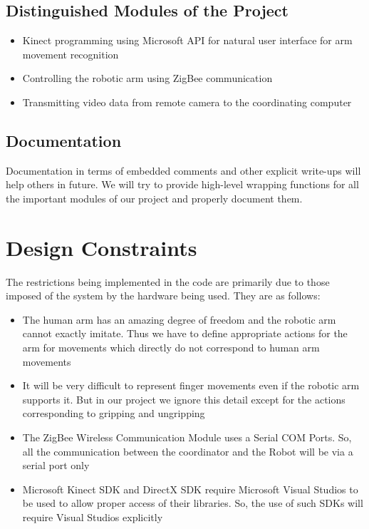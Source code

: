 \documentclass[a4wide]{scrreprt}
\begin{document}
\subsection{Distinguished Modules of the Project}
\begin{itemize}
\item Kinect programming using Microsoft API for natural user interface for arm movement recognition
\item Controlling the robotic arm using ZigBee communication
\item Transmitting video data from remote camera to the coordinating computer
\end{itemize}

\subsection{Documentation}
 Documentation in terms of embedded comments and other explicit write-ups will
help others in future. We will try to provide high-level wrapping functions for all the important modules of our project and properly document them.

\section{Design Constraints}
The restrictions being implemented in the code are primarily due to those imposed of the system by the hardware being used. They are as follows:
\begin{itemize}
\item The human arm has an amazing degree of freedom and the robotic arm cannot exactly imitate. Thus we have to define appropriate actions for the arm for movements which directly do not correspond to human arm movements
\item It will be very difficult to represent finger movements even if the robotic arm supports it. But in our project we ignore this detail except for the actions corresponding to gripping and ungripping
\item The ZigBee Wireless Communication Module uses a Serial COM Ports. So, all the communication between the coordinator and the Robot will be via a serial port only
\item Microsoft Kinect SDK and DirectX SDK require Microsoft Visual Studios to be used to allow proper access of their libraries. So, the use of such SDKs will require Visual Studios explicitly
\end{itemize}
\end{document}

